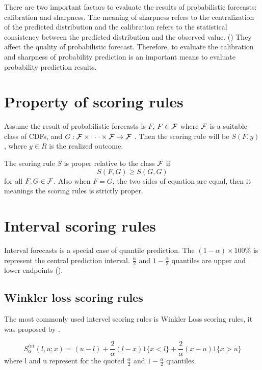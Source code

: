 \documentclass{monashthesis}
\theoremstyle{definition}
\theoremstyle{definition}
\theoremstyle{definition}
\theoremstyle{remark}
\begin{document}
There are two important factors to evaluate the results of probabilistic
forecasts: calibration and sharpness. The meaning of sharpness refers to
the centralization of the predicted distribution and the calibration
refers to the statistical consistency between the predicted distribution
and the observed value. (\textcite{GBR07}) They affect the quality of
probabilistic forecast. Therefore, to evaluate the calibration and
sharpness of probability prediction is an important means to evaluate
probability prediction results.

\section{Property of scoring rules}\label{property-of-scoring-rules}

Assume the result of probabilistic forecasts is \(F\), \(F \in \cal{F}\)
where \(\cal{F}\) is a suitable class of CDFs, and
\(G:\cal{F\times\cdot\cdot\cdot\times F\to F}\) . Then the scoring rule
will be \(S(F,y)\), where \(y \in R\) is the realized outcome.

The scoring rule \(S\) is proper relative to the class \(\cal{F}\) if
\[S(F,G)\geq S(G,G)\] for all \(F,G \in \cal{F}\). Also when \(F=G\),
the two sides of equation are equal, then it meanings the scoring rules
is strictly proper.

\section{Interval scoring rules}\label{interval-scoring-rules}

Interval forecasts is a special case of quantile prediction. The
\((1-\alpha)\times100\%\) is represent the central prediction interval.
\(\frac{\alpha}{2}\) and \(1-\frac{\alpha}{2}\) quantiles are upper and
lower endpoints (\textcite{GBR07}).

\subsection{Winkler loss scoring
rules}\label{winkler-loss-scoring-rules}

The most commonly used intervel scoring rules is Winkler Loss scoring
rules, it was proposed by \textcite{W72}.

\[
  S_\alpha^{int}(l,u;x)=(u-l)+\frac{2}{\alpha}(l-x)1\{x<l\}+\frac{2}{\alpha}(x-u)1\{x>u\}
\] where l and u represent for the quoted \(\frac{\alpha}{2}\) and
\(1-\frac{\alpha}{2}\) quantiles.
\end{document}
